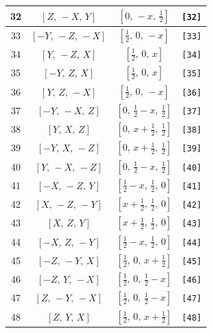 \documentclass[fleqn,8pt]{jsarticle}
\begin{document}
\begin{longtable}{cccc}
32 & $\left[ Z,\, - X,\, Y \right]$ & $\left[ 0,\, - x,\, \frac{1}{2} \right]$ & {\tt [32]} \\ \hline
33 & $\left[ - Y,\, - Z,\, - X \right]$ & $\left[ \frac{1}{2},\, 0,\, - x \right]$ & {\tt [33]} \\ \hline
34 & $\left[ Y,\, - Z,\, X \right]$ & $\left[ \frac{1}{2},\, 0,\, x \right]$ & {\tt [34]} \\ \hline
35 & $\left[ - Y,\, Z,\, X \right]$ & $\left[ \frac{1}{2},\, 0,\, x \right]$ & {\tt [35]} \\ \hline
36 & $\left[ Y,\, Z,\, - X \right]$ & $\left[ \frac{1}{2},\, 0,\, - x \right]$ & {\tt [36]} \\ \hline
37 & $\left[ - Y,\, - X,\, Z \right]$ & $\left[ 0,\, \frac{1}{2} - x,\, \frac{1}{2} \right]$ & {\tt [37]} \\ \hline
38 & $\left[ Y,\, X,\, Z \right]$ & $\left[ 0,\, x + \frac{1}{2},\, \frac{1}{2} \right]$ & {\tt [38]} \\ \hline
39 & $\left[ - Y,\, X,\, - Z \right]$ & $\left[ 0,\, x + \frac{1}{2},\, \frac{1}{2} \right]$ & {\tt [39]} \\ \hline
40 & $\left[ Y,\, - X,\, - Z \right]$ & $\left[ 0,\, \frac{1}{2} - x,\, \frac{1}{2} \right]$ & {\tt [40]} \\ \hline
41 & $\left[ - X,\, - Z,\, Y \right]$ & $\left[ \frac{1}{2} - x,\, \frac{1}{2},\, 0 \right]$ & {\tt [41]} \\ \hline
42 & $\left[ X,\, - Z,\, - Y \right]$ & $\left[ x + \frac{1}{2},\, \frac{1}{2},\, 0 \right]$ & {\tt [42]} \\ \hline
43 & $\left[ X,\, Z,\, Y \right]$ & $\left[ x + \frac{1}{2},\, \frac{1}{2},\, 0 \right]$ & {\tt [43]} \\ \hline
44 & $\left[ - X,\, Z,\, - Y \right]$ & $\left[ \frac{1}{2} - x,\, \frac{1}{2},\, 0 \right]$ & {\tt [44]} \\ \hline
45 & $\left[ - Z,\, - Y,\, X \right]$ & $\left[ \frac{1}{2},\, 0,\, x + \frac{1}{2} \right]$ & {\tt [45]} \\ \hline
46 & $\left[ - Z,\, Y,\, - X \right]$ & $\left[ \frac{1}{2},\, 0,\, \frac{1}{2} - x \right]$ & {\tt [46]} \\ \hline
47 & $\left[ Z,\, - Y,\, - X \right]$ & $\left[ \frac{1}{2},\, 0,\, \frac{1}{2} - x \right]$ & {\tt [47]} \\ \hline
48 & $\left[ Z,\, Y,\, X \right]$ & $\left[ \frac{1}{2},\, 0,\, x + \frac{1}{2} \right]$ & {\tt [48]} \\
\end{longtable}
\end{document}
